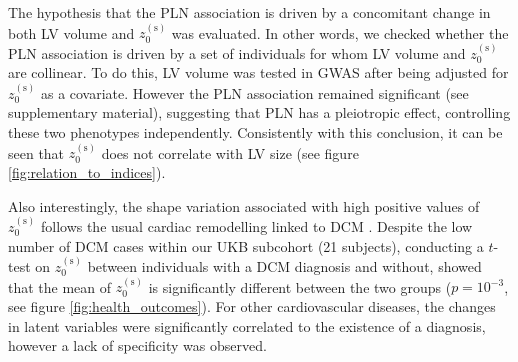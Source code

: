 The hypothesis that the PLN association is driven by a concomitant change in both LV volume and $z_0^{(\text{s})}$ was evaluated. In other words, we checked whether the PLN association is driven by a set of individuals for whom LV volume and $z_0^{(\text{s})}$ are collinear. To do this, LV volume was tested in GWAS after being adjusted for $z_0^{(\text{s})}$ as a covariate. However the PLN association remained significant (see supplementary material), suggesting that PLN has a pleiotropic effect, controlling these two phenotypes independently. Consistently with this conclusion, it can be seen that $z_0^{(\text{s})}$ does not correlate with LV size (see figure \ref{fig:relation_to_indices}).

Also interestingly, the shape variation associated with high positive values of $z_0^{(\text{s})}$ follows the usual cardiac remodelling linked to DCM \cite{ref_dcm}. Despite the low number of DCM cases within our UKB subcohort (21 subjects), conducting a $t$-test on $z_0^{(\text{s})}$ between individuals with a DCM diagnosis and without, showed that the mean of $z_0^{(\text{s})}$ is significantly different between the two groups ($p=10^{-3}$, see figure \ref{fig:health_outcomes}). For other cardiovascular diseases, the changes in latent variables were significantly correlated to the existence of a diagnosis, however a lack of specificity was observed.

